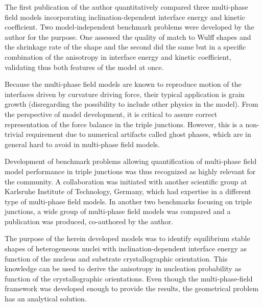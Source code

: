 The first publication of the author quantitatively compared three multi-phase field models incorporating inclination-dependent interface energy and kinetic coefficient. Two model-independent benchmark problems were developed by the author for the purpose. One assessed the quality of match to Wulff shapes and the shrinkage rate of the shape and the second did the same but in a specific combination of the anisotropy in interface energy and kinetic coefficient, validating thus both features of the model at once. 

Because the multi-phase field models are known to reproduce motion of the interfaces driven by curvature driving force, their typical application is grain growth (disregarding the possibility to include other physics in the model). From the perspective of model development, it is critical to assure correct representation of the force balance in the triple junctions. However, this is a non-trivial requirement due to numerical artifacts called ghost phases, which are in general hard to avoid in multi-phase field models. 

Development of benchmark problems allowing quantification of multi-phase field model performance in triple junctions was thus recognized as highly relevant for the community. A collaboration was initiated with another scientific group at Karlsruhe Institute of Technology, Germany, which had expertise in a different type of multi-phase field models. In another two benchmarks focusing on triple junctions, a wide group of multi-phase field models was compared and a publication was produced, co-authored by the author.


The purpose of the herein developed models was to identify equilibrium stable shapes of heterogeneous nuclei with inclination-dependent interface energy as function of the nucleus and substrate crystallographic orientation. This knowledge can be used to derive the anisotropy in nucleation probability as function of the crystallographic orientations. Even though the multi-phase-field framework was developed enough to provide the results, the geometrical problem has an analytical solution.

